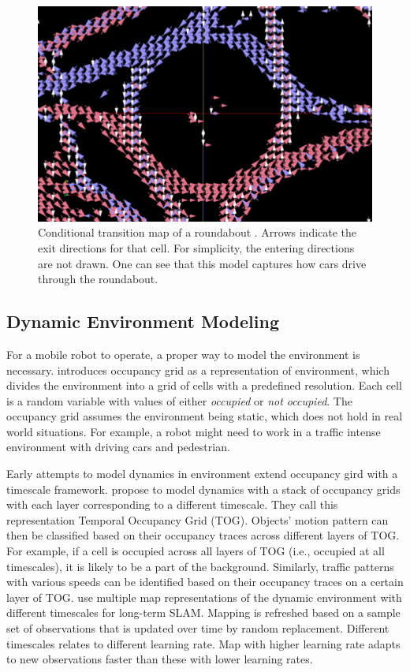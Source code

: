 \begin{figure}[H]
  \centering
    \includegraphics[width=.6\textwidth]{figures/condi_tran_map.png}
    \caption[Conditional transition map of a roundabout.]{Conditional transition map of a roundabout \citep{kucner2013conditional}. Arrows indicate the exit directions for that cell. For simplicity, the entering directions are not drawn. One can see that this model captures how cars drive through the roundabout. }
    \label{fig:condi_tran_map}
\end{figure} 

\subsection{Dynamic Environment Modeling}

For a mobile robot to operate, a proper way to model the environment is necessary. \citet{elfes1989using} introduces occupancy grid as a representation of environment, which divides the environment into a grid of cells with a predefined resolution. Each cell is a random variable with values of either \textit{occupied} or \textit{not occupied}. The occupancy grid assumes the environment being static, which does not hold in real world situations. For example, a robot might need to work in a traffic intense environment with driving cars and pedestrian. 

Early attempts to model dynamics in environment extend occupancy gird with a timescale framework. \citet{arbuckle2002temporal} propose to model dynamics with a stack of occupancy grids with each layer corresponding to a different timescale. They call this representation Temporal Occupancy Grid (TOG). Objects' motion pattern can then be classified based on their occupancy traces across different layers of TOG. For example, if a cell is occupied across all layers of TOG (i.e., occupied at all timescales), it is likely to be a part of the background. Similarly, traffic patterns with various speeds can be identified based on their occupancy traces on a certain layer of TOG. \citet{biber2009experimental} use multiple map representations of the dynamic environment with different timescales for long-term SLAM. Mapping is refreshed based on a sample set of observations that is updated over time by random replacement. Different timescales relates to different learning rate. Map with higher learning rate adapts to new observations faster than these with lower learning rates.


